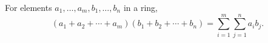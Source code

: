 For elements $a_1, \ldots, a_m, b_1, \ldots, b_n$ in a ring,
$$(a_1 + a_2 + \cdots + a_m)(b_1 + b_2 + \cdots + b_n) = \sum_{i=1}^{m} \sum_{j=1}^{n} a_i b_j.$$
